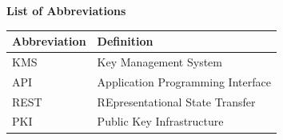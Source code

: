 \vspace*{1cm}
\begin{center}
    \textbf{\huge{List of Abbreviations}}
\end{center}
\vspace{1cm}

\begin{doublespace}
    \begin{center}
        \begin{tabular}{|l|l|}
            \hline
            \textbf{Abbreviation} &  \textbf{Definition} \\

            \hline
            KMS & Key Management System \\

            \hline
            API & Application Programming Interface \\

            \hline
            REST & REpresentational State Transfer \\

            \hline
            PKI & Public Key Infrastructure \\
            
            \hline
        \end{tabular}
    \end{center}
\end{doublespace}